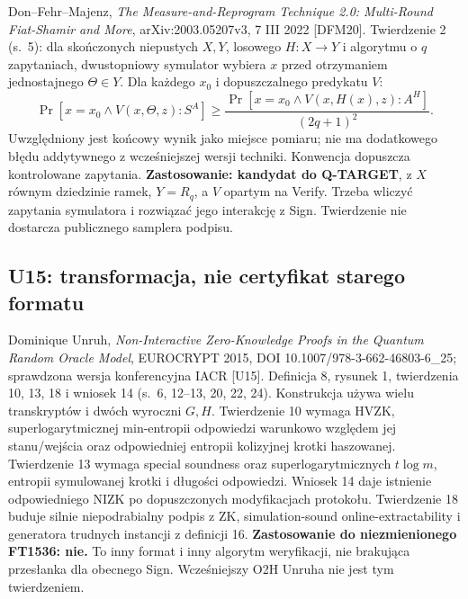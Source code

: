 \documentclass[11pt,a4paper]{article}
\begin{document}
Don--Fehr--Majenz, \emph{The Measure-and-Reprogram Technique 2.0:
Multi-Round Fiat-Shamir and More}, arXiv:2003.05207v3, 7 III 2022 [DFM20].
Twierdzenie 2 (s.~5): dla skończonych niepustych $X,Y$, losowego
$H:X\to Y$ i algorytmu o $q$ zapytaniach, dwustopniowy symulator wybiera
$x$ przed otrzymaniem jednostajnego $\Theta\in Y$. Dla każdego $x_0$
i dopuszczalnego predykatu $V$:
\[
 \Pr[x=x_0\land V(x,\Theta,z):S^A]
 \ge\frac{\Pr[x=x_0\land V(x,H(x),z):A^H]}{(2q+1)^2}.
\]
Uwzględniony jest końcowy wynik jako miejsce pomiaru; nie ma dodatkowego
błędu addytywnego z wcześniejszej wersji techniki. Konwencja dopuszcza
kontrolowane zapytania. \textbf{Zastosowanie: kandydat do Q-TARGET}, z
$X$ równym dziedzinie ramek, $Y=R_q$, a $V$ opartym na Verify.
Trzeba wliczyć zapytania symulatora i rozwiązać jego interakcję z Sign.
Twierdzenie nie dostarcza publicznego samplera podpisu.

\subsection*{U15: transformacja, nie certyfikat starego formatu}
Dominique Unruh, \emph{Non-Interactive Zero-Knowledge Proofs in the Quantum
Random Oracle Model}, EUROCRYPT 2015, DOI 10.1007/978-3-662-46803-6\_25;
sprawdzona wersja konferencyjna IACR [U15]. Definicja 8, rysunek 1,
twierdzenia 10, 13, 18 i wniosek 14 (s.~6, 12--13, 20, 22, 24).
Konstrukcja używa wielu transkryptów i dwóch wyroczni $G,H$.
Twierdzenie 10 wymaga HVZK, superlogarytmicznej min-entropii odpowiedzi
warunkowo względem jej stanu/wejścia oraz odpowiedniej entropii kolizyjnej
krotki haszowanej. Twierdzenie 13 wymaga special soundness oraz
superlogarytmicznych $t\log m$, entropii symulowanej krotki i długości odpowiedzi.
Wniosek 14 daje istnienie odpowiedniego NIZK po dopuszczonych modyfikacjach
protokołu. Twierdzenie 18 buduje silnie niepodrabialny podpis z ZK,
simulation-sound online-extractability i generatora trudnych instancji
z definicji 16. \textbf{Zastosowanie do niezmienionego FT1536: nie.}
To inny format i inny algorytm weryfikacji, nie brakująca przesłanka
dla obecnego Sign. Wcześniejszy O2H Unruha nie jest tym twierdzeniem.
\end{document}
